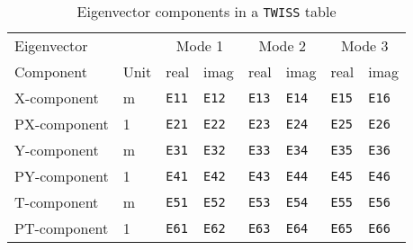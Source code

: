 \begin{table}[Ht] \footnotesize
  \begin{center}
    \caption{Eigenvector components in a \texttt{TWISS} table}
    \label{tab:twiss-eig}
    \begin{tabular}{|l|l|l|l|l|l|l|l|}
      \hline
      Eigenvector & &
      \multicolumn{2}{c|}{Mode 1} &
      \multicolumn{2}{c|}{Mode 2} &
      \multicolumn{2}{c|}{Mode 3} \\
      Component & Unit & real & imag & real & imag & real & imag \\
      \hline
      X-component & m &
      \texttt{E11}\index{E11} & \texttt{E12}\index{E12} &
      \texttt{E13}\index{E13} & \texttt{E14}\index{E14} &
      \texttt{E15}\index{E15} & \texttt{E16}\index{E16} \\
      PX-component & 1 &
      \texttt{E21}\index{E21} & \texttt{E22}\index{E22} &
      \texttt{E23}\index{E23} & \texttt{E24}\index{E24} &
      \texttt{E25}\index{E25} & \texttt{E26}\index{E26} \\
      Y-component & m &
      \texttt{E31}\index{E31} & \texttt{E32}\index{E32} &
      \texttt{E33}\index{E33} & \texttt{E34}\index{E34} &
      \texttt{E35}\index{E35} & \texttt{E36}\index{E36} \\
      PY-component & 1 &
      \texttt{E41}\index{E41} & \texttt{E42}\index{E42} &
      \texttt{E43}\index{E43} & \texttt{E44}\index{E44} &
      \texttt{E45}\index{E45} & \texttt{E46}\index{E46} \\
      T-component & m &
      \texttt{E51}\index{E51} & \texttt{E52}\index{E52} &
      \texttt{E53}\index{E53} & \texttt{E54}\index{E54} &
      \texttt{E55}\index{E55} & \texttt{E56}\index{E56} \\
      PT-component & 1 &
      \texttt{E61}\index{E61} & \texttt{E62}\index{E62} &
      \texttt{E63}\index{E63} & \texttt{E64}\index{E64} &
      \texttt{E65}\index{E65} & \texttt{E66}\index{E66} \\
      \hline                  
    \end{tabular}
  \end{center}
\end{table}

